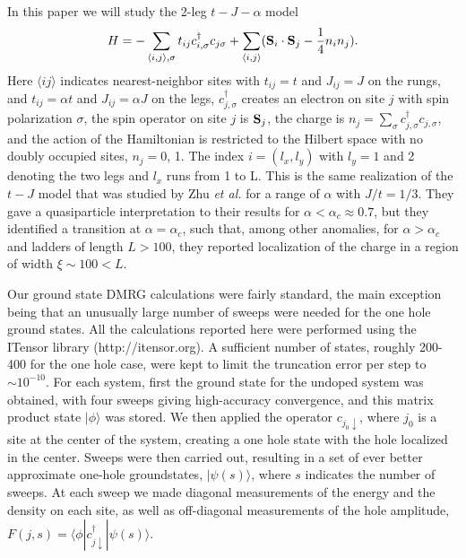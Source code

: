 \documentclass[aps,prb,twocolumn]{revtex4}
\begin{document}
In this paper we will study the 2-leg $t-J-\alpha$ model 
%
\begin{equation}
  H= -\sum_{\langle i,j\rangle ,\sigma}t_{ij}c^{\dagger}_{i,\sigma}c_{j\sigma}+\sum_{\langle i,j\rangle }(\bold S_i\cdot \bold S_j-\frac{1}{4}n_i n_j) .
\label{eq:1}
\end{equation}
Here $\langle ij\rangle $
indicates nearest-neighbor sites with $t_{ij}=t $ and $J_{ij}=J$ on the rungs, and
 $t_{ij}=\alpha t $ and $J_{ij}=\alpha J$ on the legs, 
$c_{j,\sigma}^\dagger$ creates an electron on site $j$ with spin polarization
$\sigma$,  the spin operator on site $j$ is $\bold S_j$, the charge is
$n_j=\sum_{\sigma}c_{j,\sigma}^\dagger c_{j,\sigma}$, and the action of the
Hamiltonian is restricted to the Hilbert space with no doubly occupied sites,
$n_j=0$, 1.  The index $ i=
(l_x,l_y)$ with $l_y=1 $ and 2 denoting the two legs and $ l_x$
 runs from 1 to L. This is the same realization of the $t-J$ model that was studied
by Zhu {\it et al.} for a range of $\alpha$ with $J/t=1/3$.  They gave a %
quasiparticle interpretation to their results for $\alpha < \alpha_c\approx
0.7$, but they identified a transition  at $\alpha=\alpha_c$, such that, among
other anomalies,  for $\alpha > \alpha_c$ and ladders of length $L > 100$, they
reported 
 localization of the charge in a region  of width $\xi \sim 100 < L$. 


Our ground state DMRG calculations were fairly standard, the main exception being 
that an unusually large number of sweeps were needed for the one hole ground states. 
All the calculations reported here were
performed using the ITensor library (http://itensor.org). 
A sufficient number of states, roughly 200-400 for the one hole case, were kept
to limit the truncation error per step to $\sim 10^{-10}$.  For each system,
first the ground state for the undoped system was obtained, with four sweeps
giving high-accuracy convergence, and this matrix product state $|\phi \rangle$
was stored. We then applied the operator $c_{j_0\downarrow}$, where $j_0$
is a site at the center of the system, creating a one hole state with the hole localized 
in the center. Sweeps were then carried out, resulting in a set of ever better
approximate one-hole groundstates, $|\psi(s)\rangle$, where $s$ 
indicates the number of sweeps.  At each sweep we made diagonal measurements 
of the energy and the density on each site,
as well as off-diagonal measurements of 
the hole amplitude, $F(j,s) = \langle \phi | c^\dagger_{j\downarrow} |\psi(s)\rangle$. 
\end{document}

